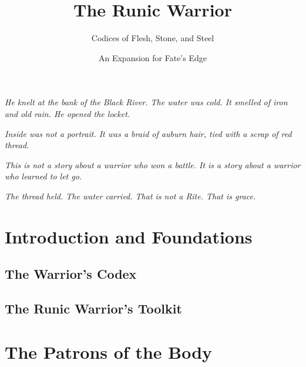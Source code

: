\documentclass[11pt,letterpaper]{book}
\title{The Runic Warrior}
\subtitle{Codices of Flesh, Stone, and Steel}
\author{An Expansion for Fate's Edge}
\date{}
\newcommand{\cfile}[1]{}
\begin{document}
\maketitle
\thispagestyle{empty}

\newpage
\thispagestyle{empty}
\vspace*{\fill}
\begin{center}
\textit{He knelt at the bank of the Black River. The water was cold. It smelled of iron and old rain. He opened the locket.}

\vspace{1em}

\textit{Inside was not a portrait. It was a braid of auburn hair, tied with a scrap of red thread.}

\vspace{1em}

\textit{This is not a story about a warrior who won a battle. It is a story about a warrior who learned to let go.}

\vspace{1em}

\textit{The thread held. The water carried. That is not a Rite. That is grace.}
\end{center}
\vspace*{\fill}
\newpage

\tableofcontents
\newpage

\part{Introduction and Foundations}

\chapter{The Warrior's Codex}
\cfile{introduction/01_what_is_body_runekeeper}
\cfile{introduction/02_philosophy_of_physical_obligation}
\cfile{introduction/03_how_to_use_this_expansion}

\chapter{The Runic Warrior's Toolkit}
\cfile{toolkit/01_codex_as_flesh_stone_steel}
\cfile{toolkit/02_thiasos_as_ally}
\cfile{toolkit/03_obligation_as_physical_weight}
\cfile{toolkit/04_new_core_talents}

\part{The Patrons of the Body}
\end{document}
